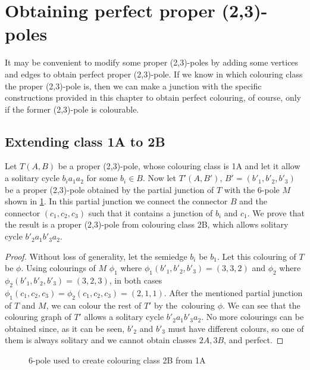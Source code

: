 \section{Obtaining perfect proper (2,3)-poles}\label{sec:classes-to-perfect}

It may be convenient to modify some proper (2,3)-poles by adding some vertices and edges to obtain perfect proper (2,3)-pole. If we know in which colouring class the proper (2,3)-pole is, then we can make a junction with the specific constructions provided in this chapter to obtain perfect colouring, of course, only if the former (2,3)-pole is colourable. 

\subsection{Extending class 1A to 2B}

Let $T(A,B)$ be a proper (2,3)-pole, whose colouring class is 1A and let it allow a solitary cycle $b_ia_1a_2$ for some $b_i\in B$. Now let $T'(A,B')$, $B'=(b'_1, b'_2, b'_3)$ be a proper (2,3)-pole obtained by the partial junction of $T$ with the 6-pole $M$ shown in \cref{fig:1A2B}. In this partial junction we connect the connector $B$ and the connector $(c_1,c_2,c_3)$ such that it contains a junction of $b_i$ and $c_1$. We prove that the result is a proper (2,3)-pole from colouring class 2B, which allows solitary cycle $b'_2a_1b'_3a_2$.

\begin{proof}
	Without loss of generality, let the semiedge $b_i$ be $b_1$. Let this colouring of $T$ be $\phi$. Using colourings of $M$ $\phi_1$ where $\phi_1(b'_1,b'_2,b'_3)=(3,3,2)$ and $\phi_2$ where $\phi_2(b'_1,b'_2,b'_3)=(3,2,3)$, in both cases $\phi_1(c_1,c_2,c_3)=\phi_2(c_1,c_2,c_3)=(2,1,1)$. After the mentioned partial junction of $T$ and $M$, we can colour the rest of $T'$ by the~colouring $\phi$. We can see that the colouring graph of $T'$ allows a solitary cycle $b'_2a_1b'_3a_2$. No more colourings can be obtained since, as it can be seen, $b'_2$ and $b'_3$ must have different colours, so one of them is always solitary and we cannot obtain classes $2A,3B$, and perfect.
\end{proof}

\begin{figure}
	\centering
	
	\caption{6-pole used to create colouring class 2B from 1A}
	\label{fig:1A2B}
\end{figure}

